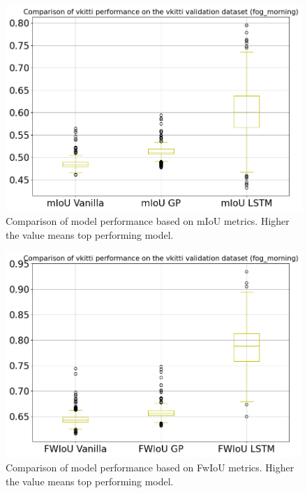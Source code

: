 	\begin{figure}[h]
		\centering
	
		\includegraphics[width=12cm]{images/two_vkitti_mIoU.png}
		\caption{Comparison of model performance based on mIoU metrics. Higher the value means top performing model.}
		\label{fig:performance_metric_unet}
	\end{figure}

	\begin{figure}[h]
		\centering
	
		\includegraphics[width=12cm]{images/two_vkitti_FwIoU.png}
		\caption{Comparison of model performance based on FwIoU metrics. Higher the value means top performing model.}
		\label{fig:performance_metric_unet}
	\end{figure}

